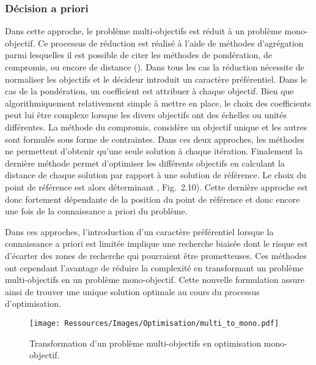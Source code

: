 \subsubsection{Décision a priori} %
\label{ssub:decision_a_priori}
Dans cette approche, le problème multi-objectifs est réduit à un problème mono-objectif.
Ce processus de réduction est réalisé à l’aide de méthodes d’agrégation parmi lesquelles
il est possible de citer les méthodes de pondération, de compromis,
ou encore de distance (). Dans tous les cas la réduction
nécessite de normaliser les objectifs et le décideur introduit un caractère préférentiel.
Dans le cas de la pondération, un coefficient est attribuer à chaque objectif. Bien que
algorithmiquement relativement simple à mettre en place, le choix des coefficients peut
lui être complexe lorsque les divers objectifs ont des échelles ou unités différentes.
La méthode du compromis, considère un objectif unique et les autres sont formulés
sous forme de contraintes. Dans ces deux approches, les méthodes ne permettent
d’obtenir qu’une seule solution à chaque itération.
Finalement la dernière méthode permet d’optimiser les différents objectifs en calculant
la distance de chaque solution par rapport à une solution de référence. Le choix
du point de référence est alors déterminant \parencite{Collette2002}, Fig.~2.10).
Cette dernière approche est donc fortement dépendante de la position du point de
référence et donc encore une fois de la connaissance a priori du problème.

Dans ces approches, l’introduction d’un caractère préférentiel lorsque la connaissance a priori
est limitée implique une recherche biaisée dont le risque est d’écarter des zones
de recherche qui pourraient être prometteuses. Ces méthodes ont cependant l’avantage
de réduire la complexité en transformant un problème multi-objectifs en un problème
mono-objectif. Cette nouvelle formulation assure ainsi de trouver une unique solution
optimale au cours du processus d’optimisation.

\begin{figure}
    \centering
    \texttt{[image: Ressources/Images/Optimisation/multi\_to\_mono.pdf]}
    \caption[Transformation d’un problème multi-objectifs en optimisation mono-objectif]
            {Transformation d’un problème multi-objectifs en optimisation mono-objectif.}
    \label{fig:multi_to_mono}
\end{figure}


